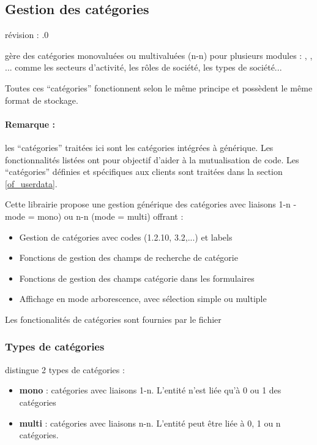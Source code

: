 

\subsection{Gestion des catégories}
\label{of_category}

révision : .0

\obm gère des catégories monovaluées ou multivaluées (n-n) pour plusieurs modules : \company, \contact, \deal... comme les secteurs d'activité, les rôles de société, les types de société...

Toutes ces ``catégories'' fonctionnent selon le même principe et possèdent le même format de stockage.

\paragraph{Remarque :} les ``catégories'' traitées ici sont les catégories intégrées à \obm générique. Les fonctionnalités listées ont pour objectif d'aider à la mutualisation de code. Les ``catégories'' définies et spécifiques aux clients sont traitées dans la section \ref{of_userdata}.

Cette librairie propose une gestion générique des catégories avec liaisons 1-n -mode = mono) ou n-n (mode = multi) offrant :\\

\begin{itemize}
\item Gestion de catégories avec codes (1.2.10, 3.2,...) et labels
\item Fonctions de gestion des champs de recherche de catégorie
\item Fonctions de gestion des champs catégorie dans les formulaires
\item Affichage en mode arborescence, avec sélection simple ou multiple
\end{itemize}
\vspace{0.3cm}

Les fonctionalités de catégories sont fournies par le fichier 


\subsubsection{Types de catégories}

\obm distingue 2 types de catégories :\\
\begin{itemize}
\item \textbf{mono} : catégories avec liaisons 1-n. L'entité n'est liée qu'à 0 ou 1 des catégories
\item \textbf{multi} : catégories avec liaisons n-n. L'entité peut être liée à 0, 1  ou n catégories.
\end{itemize}

